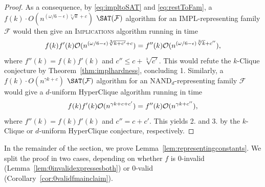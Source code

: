 \documentclass[10pt,a4paper]{article}
\theoremstyle{plain}
\newcommand{\Oh}{{\cal O}}
\newcommand{\NAND}{\mathrm{NAND}}
\newcommand{\Impl}{\mathrm{IMPL}}
\newcommand{\confam}{\mathcal{F}}
\newcommand{\Implication}{\textsc{Implications}\xspace}
\newcommand{\eps}{\epsilon}
\begin{document}
\begin{proof}
%
As a consequence, by \eqref{eq:impltoSAT} and \eqref{eq:restToFam}, a $f(k) \cdot O(n^{(\omega/6-\eps)\sqrt[3]{k}+c})$ $\SAT(\confam)$ algorithm for an $\Impl$-representing family $\confam$ would then give an \Implication algorithm running in time  
\[f(k) f'(k) \Oh(n^{(\omega/6-\eps)\sqrt[3]{k+c'}+c})= f''(k) \Oh(n^{(\omega/6-\eps)\sqrt[3]{k}+c''}),\]
where $f''(k) = f(k) f'(k)$ and $c'' \le c+\sqrt[3]{c'}$. This would refute the $k$-Clique conjecture by Theorem~\ref{thm:implhardness}, concluding 1.
%
Similarly, a $f(k) \cdot O(n^{\gamma k+c})$ $\SAT(\confam)$ algorithm for an $\NAND_d$-representing family $\confam$ would give a $d$-uniform HyperClique algorithm running in time  
\[f(k) f'(k) \Oh(n^{\gamma k+c+c'})= f''(k) \Oh(n^{\gamma k +c''}),\]
where $f''(k) = f(k) f'(k)$ and $c'' = c+c'$. This yields 2. and 3. by the $k$-Clique or $d$-uniform HyperClique conjecture, respectively.
\end{proof}
%
In the remainder of the section, we prove Lemma~\ref{lem:representingconstants}. We split the proof in two cases, depending on whether $f$ is 0-invalid (Lemma~\ref{lem:0invalidexpressesboth}) or 0-valid (Corollary~\ref{cor:0validfmainclaim}).
%
\end{document}
